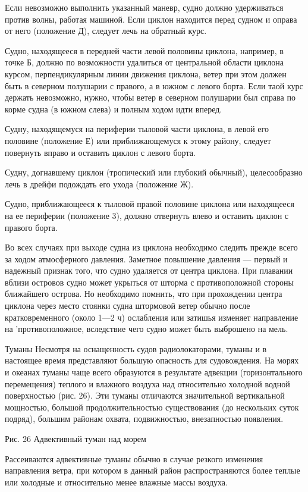 Если невозможно выполнить указанный маневр, судно должно удерживаться против волны, работая машиной. Если циклон находится перед судном и оправа от него (положение Д), следует лечь на обратный курс.

Судно, находящееся в передней части левой половины циклона, например, в точке Б, должно по возможности удалиться от центральной области циклона курсом, перпендикулярным линии движения циклона, ветер при этом должен быть в северном полушарии с правого, а в южном с левого борта. Если таой курс держать невозможно, нужно, чтобы ветер в северном полушарии был справа по корме судна (в южном слева) и полным ходом идти вперед.

Судну, находящемуся на периферии тыловой части циклона, в левой его половине (положение Е) или приближающемуся к этому району, следует повернуть вправо и оставить циклон с левого борта.

Судну, догнавшему циклон (тропический или глубокий обычный), целесообразно лечь в дрейфи подождать его ухода (положение Ж).

Судно, приближающееся к тыловой правой половине циклона или находящееся на ее периферии (положение 3), должно отвернуть влево и оставить циклон с правого борта.

Во всех случаях при выходе судна из циклона необходимо следить прежде всего за ходом атмосферного давления. Заметное повышение давления — первый и надежный признак того, что судно удаляется от центра циклона. При плавании вблизи островов судно может укрыться от шторма с противоположной стороны ближайшего острова. Но необходимо помнить, что при прохождении центра циклона через место стоянки судна штормовой ветер обычно после кратковременного (около 1—2 ч) ослабления или затишья изменяет направление на 'противоположное, вследствие чего судно может быть выброшено на мель.

Туманы
Несмотря на оснащенность судов радиолокаторами, туманы и в настоящее время представляют большую опасность для судовождения. На морях и океанах туманы чаще всего образуются в результате адвекции (горизонтального перемещения) теплого и влажного воздуха над относительно холодной водной поверхностью (рис. 26). Эти туманы отличаются значительной вертикальной мощностью, большой продолжительностью существования (до нескольких суток подряд), большим районам охвата, подвижностью, внезапностью появления.


Рис. 26 Адвективный туман над морем

Рассеиваются адвективные туманы обычно в случае резкого изменения направления ветра, при котором в данный район распространяются более теплые или холодные и относительно менее влажные массы воздуха.

